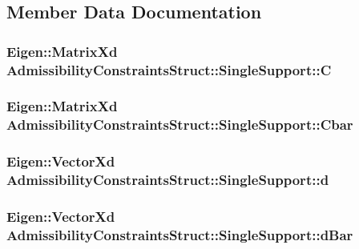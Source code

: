 \subsection{\-Member \-Data \-Documentation}
\hypertarget{structAdmissibilityConstraintsStruct_1_1SingleSupport_abebf0f46c38b599fd621df82309c13f3}{
\subsubsection[{\-C}]{\setlength{\rightskip}{0pt plus 5cm}\-Eigen\-::\-Matrix\-Xd {\bf \-Admissibility\-Constraints\-Struct\-::\-Single\-Support\-::\-C}}}\label{structAdmissibilityConstraintsStruct_1_1SingleSupport_abebf0f46c38b599fd621df82309c13f3}
\hypertarget{structAdmissibilityConstraintsStruct_1_1SingleSupport_a9443a6065e6f1cd7d54b896269d9da1a}{
\subsubsection[{\-Cbar}]{\setlength{\rightskip}{0pt plus 5cm}\-Eigen\-::\-Matrix\-Xd {\bf \-Admissibility\-Constraints\-Struct\-::\-Single\-Support\-::\-Cbar}}}\label{structAdmissibilityConstraintsStruct_1_1SingleSupport_a9443a6065e6f1cd7d54b896269d9da1a}
\hypertarget{structAdmissibilityConstraintsStruct_1_1SingleSupport_aa0a40e7e0a4f8031dc2bf8e9a2da3344}{
\subsubsection[{d}]{\setlength{\rightskip}{0pt plus 5cm}\-Eigen\-::\-Vector\-Xd {\bf \-Admissibility\-Constraints\-Struct\-::\-Single\-Support\-::d}}}\label{structAdmissibilityConstraintsStruct_1_1SingleSupport_aa0a40e7e0a4f8031dc2bf8e9a2da3344}
\hypertarget{structAdmissibilityConstraintsStruct_1_1SingleSupport_adce7d8739e27981f9b6a61e35c261bef}{
\subsubsection[{d\-Bar}]{\setlength{\rightskip}{0pt plus 5cm}\-Eigen\-::\-Vector\-Xd {\bf \-Admissibility\-Constraints\-Struct\-::\-Single\-Support\-::d\-Bar}}}\label{structAdmissibilityConstraintsStruct_1_1SingleSupport_adce7d8739e27981f9b6a61e35c261bef}
